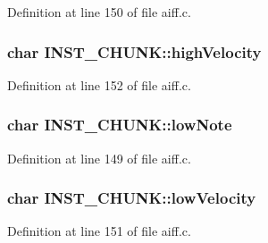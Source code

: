 Definition at line 150 of file aiff.\+c.

\subsubsection[{\texorpdfstring{high\+Velocity}{highVelocity}}]{\setlength{\rightskip}{0pt plus 5cm}char I\+N\+S\+T\+\_\+\+C\+H\+U\+N\+K\+::high\+Velocity}\hypertarget{struct_i_n_s_t___c_h_u_n_k_a4bf9443567926117d6603a02b56785eb}{}\label{struct_i_n_s_t___c_h_u_n_k_a4bf9443567926117d6603a02b56785eb}


Definition at line 152 of file aiff.\+c.

\subsubsection[{\texorpdfstring{low\+Note}{lowNote}}]{\setlength{\rightskip}{0pt plus 5cm}char I\+N\+S\+T\+\_\+\+C\+H\+U\+N\+K\+::low\+Note}\hypertarget{struct_i_n_s_t___c_h_u_n_k_a915f90531c6968c5dd3534aa21052e5b}{}\label{struct_i_n_s_t___c_h_u_n_k_a915f90531c6968c5dd3534aa21052e5b}


Definition at line 149 of file aiff.\+c.

\subsubsection[{\texorpdfstring{low\+Velocity}{lowVelocity}}]{\setlength{\rightskip}{0pt plus 5cm}char I\+N\+S\+T\+\_\+\+C\+H\+U\+N\+K\+::low\+Velocity}\hypertarget{struct_i_n_s_t___c_h_u_n_k_a6ba82c7834b47c66cdeca805fc7df41f}{}\label{struct_i_n_s_t___c_h_u_n_k_a6ba82c7834b47c66cdeca805fc7df41f}


Definition at line 151 of file aiff.\+c.

